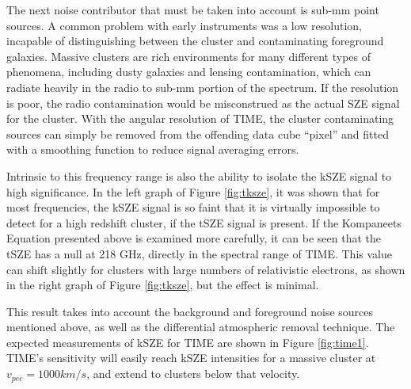 \documentclass[manuscript]{aastex}
\begin{document}
The next noise contributor that must be taken into account is sub-mm point sources. A common problem with early instruments was a low resolution, incapable of distinguishing between the cluster and contaminating foreground galaxies. Massive clusters are rich environments for many different types of phenomena, including dusty galaxies and lensing contamination, which can radiate heavily in the radio to sub-mm portion of the spectrum. If the resolution is poor, the radio contamination would be misconstrued as the actual SZE signal for the cluster. With the angular resolution of TIME, the cluster contaminating sources can simply be removed from the offending data cube ``pixel'' and fitted with a smoothing function to reduce signal averaging errors. 

Intrinsic to this frequency range is also the ability to isolate the kSZE signal to high significance. In the left graph of Figure \ref{fig:tksze}, it was shown that for most frequencies, the kSZE signal is so faint that it is virtually impossible to detect for a high redshift cluster, if the tSZE signal is present. If the Kompaneets Equation presented above is examined more carefully, it can be seen that the tSZE has a null at 218 GHz, directly in the spectral range of TIME. This value can shift slightly for clusters with large numbers of relativistic electrons, as shown in the right graph of Figure \ref{fig:tksze}, but the effect is minimal. 

This result takes into account the background and foreground noise sources mentioned above, as well as the differential atmospheric removal technique. The expected measurements of kSZE for TIME are shown in Figure \ref{fig:time1}. TIME's sensitivity will easily reach kSZE intensities for a massive cluster at $v_{pec} = 1000 km/s$, and extend to clusters below that velocity.
\end{document}
